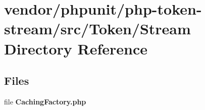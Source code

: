 \section{vendor/phpunit/php-\/token-\/stream/src/\+Token/\+Stream Directory Reference}
\label{dir_73ddffb7c2b83f41d3be7a12da924546}
\subsection*{Files}
\begin{DoxyCompactItemize}
\item 
file {\bf Caching\+Factory.\+php}
\end{DoxyCompactItemize}
